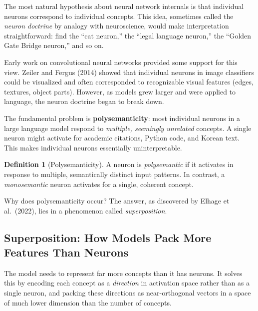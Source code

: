 \documentclass[11pt, a4paper]{article}
\theoremstyle{definition}
\newtheorem{definition}{Definition}[section]
\theoremstyle{plain}
\begin{document}
The most natural hypothesis about neural network internals is that
individual neurons correspond to individual concepts.  This idea, sometimes
called the \emph{neuron doctrine} by analogy with neuroscience, would make
interpretation straightforward: find the ``cat neuron,'' the ``legal
language neuron,'' the ``Golden Gate Bridge neuron,'' and so on.

Early work on convolutional neural networks provided some support for this
view.  Zeiler and Fergus (2014) showed that individual neurons in image
classifiers could be visualized and often corresponded to recognizable
visual features (edges, textures, object parts).  However, as models grew
larger and were applied to language, the neuron doctrine began to break down.

The fundamental problem is \textbf{polysemanticity}: most individual
neurons in a large language model respond to \emph{multiple, seemingly
unrelated} concepts.  A single neuron might activate for academic
citations, Python code, and Korean text.  This makes individual neurons
essentially uninterpretable.

\begin{definition}[Polysemanticity]
A neuron is \emph{polysemantic} if it activates in response to multiple,
semantically distinct input patterns.  In contrast, a \emph{monosemantic}
neuron activates for a single, coherent concept.
\end{definition}

Why does polysemanticity occur?  The answer, as discovered by Elhage et
al.\ (2022), lies in a phenomenon called \emph{superposition}.

\subsection{Superposition: How Models Pack More Features Than Neurons}
\label{sec:superposition}

\begin{keyinsight}
The model needs to represent far more concepts than it has neurons.  It
solves this by encoding each concept as a \emph{direction} in activation
space rather than as a single neuron, and packing these directions as
near-orthogonal vectors in a space of much lower dimension than the
number of concepts.
\end{keyinsight}
\end{document}

